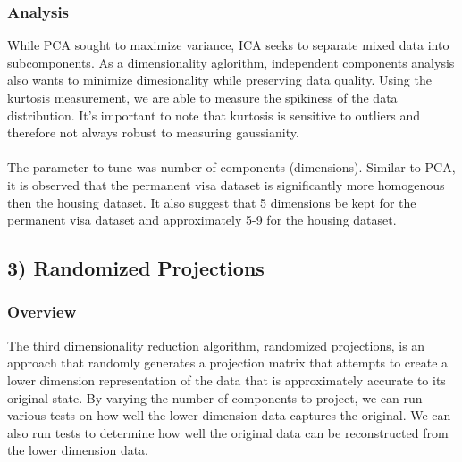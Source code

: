 \documentclass[h]{article}
\begin{document}
\subsubsection*{Analysis}
While PCA sought to maximize variance, ICA seeks to separate mixed data into 
subcomponents.  As a dimensionality aglorithm, independent components analysis also wants to minimize 
dimesionality while preserving data quality.  Using the kurtosis measurement, 
we are able to measure the spikiness of the data distribution.  It's important to note that kurtosis is 
sensitive to outliers and therefore not always robust to measuring gaussianity. 
\\ \\ 
The parameter to tune was number of components (dimensions).  Similar to PCA, it is observed that the permanent visa dataset is significantly 
more homogenous then the housing dataset.  It also suggest that 5 dimensions 
be kept for the permanent visa dataset and approximately 5-9 for the housing 
dataset.


\subsection*{3) Randomized Projections}  
\subsubsection*{Overview}
The third dimensionality reduction algorithm, randomized projections, is an 
approach that randomly generates a projection matrix that attempts to create a 
lower dimension representation of the data that is approximately accurate to 
its original state.  By varying the number of components to project, we can run 
various tests on how well the lower dimension data captures the original.  We 
can also run tests to determine how well the original data can be reconstructed 
from the lower dimension data.
\\ \\
\end{document}
